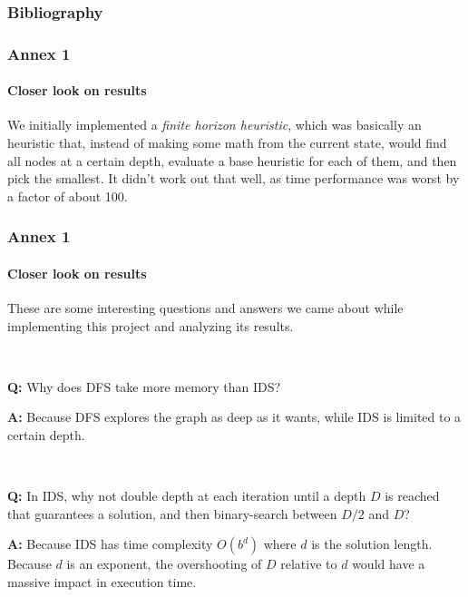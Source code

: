 \documentclass{beamer}
\begin{document}
\begin{frame}
\end{frame}

\begin{frame}
  \frametitle{Bibliography}
  
  
  
\end{frame}

\begin{frame}
  \frametitle{Annex 1}
  \framesubtitle{Closer look on results}

  We initially implemented a \textit{finite horizon heuristic}, which was basically an heuristic that, instead of making some math from the current state, would find all nodes at a certain depth, evaluate a base heuristic for each of them, and then pick the smallest.
  It didn't work out that well, as time performance was worst by a factor of about 100.

\end{frame}

\begin{frame}
  \frametitle{Annex 1}
  \framesubtitle{Closer look on results}

  These are some interesting questions and answers we came about while implementing this project and analyzing its results.

  ~
  
  \textbf{Q:} Why does DFS take more memory than IDS?
  
  \textbf{A:} Because DFS explores the graph as deep as it wants, while IDS is limited to a certain depth.
  
  ~

  \textbf{Q:} In IDS, why not double depth at each iteration until a depth $D$ is reached that guarantees a solution, and then binary-search between $D/2$ and $D$?

  \textbf{A:} Because IDS has time complexity $O(b^d)$ where $d$ is the solution length. Because $d$ is an exponent, the overshooting of $D$ relative to $d$ would have a massive impact in execution time.

\end{frame}
\end{document}
